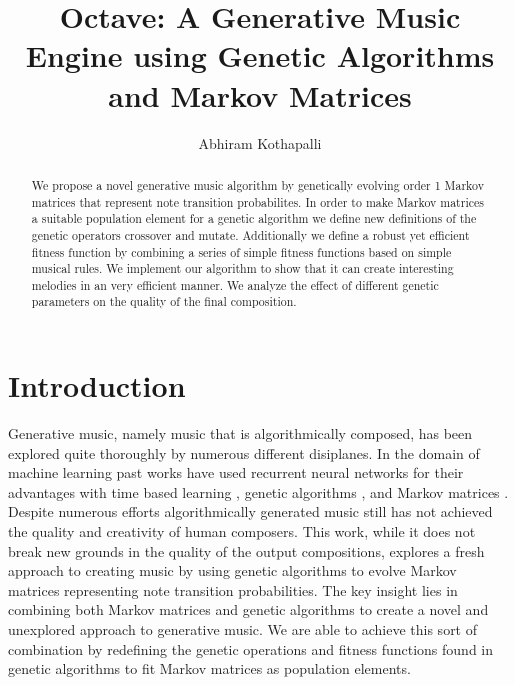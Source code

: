 \documentclass{article}
\title{Octave: A Generative Music Engine using Genetic Algorithms and Markov Matrices}
\author{Abhiram Kothapalli}
\date{}
\begin{document}
\maketitle

\begin{abstract}
We propose a novel generative music algorithm by genetically evolving order 1 Markov matrices that represent note transition probabilites. In order to make Markov matrices a suitable population element for a genetic algorithm we define new definitions of the genetic operators crossover and mutate. Additionally we define a robust yet efficient fitness function by combining a series of simple fitness functions based on simple musical rules. We implement our algorithm to show that it can create interesting melodies in an very efficient manner. We analyze the effect of different genetic parameters on the quality of the final composition.
\end{abstract}

\section{Introduction}

Generative music, namely music that is algorithmically composed, has been explored quite thoroughly by numerous different disiplanes. In the domain of machine learning past works have used recurrent neural networks for their advantages with time based learning \cite{akten9realtime, 938515, DBLP:journals/corr/Graves13}, genetic algorithms \cite{eigenfeldt2015generative, miranda2001composing}, and Markov matrices \cite{fernandez2013ai}. Despite numerous efforts algorithmically generated music still has not achieved the quality and creativity of human composers. This work, while it does not break new grounds in the quality of the output compositions, explores a fresh approach to creating music by using genetic algorithms to evolve Markov matrices representing note transition probabilities. The key insight lies in combining both Markov matrices and genetic algorithms to create a novel and unexplored approach to generative music. We are able to achieve this sort of combination by redefining the genetic operations and fitness functions found in genetic algorithms to fit Markov matrices as population elements.
\end{document}
